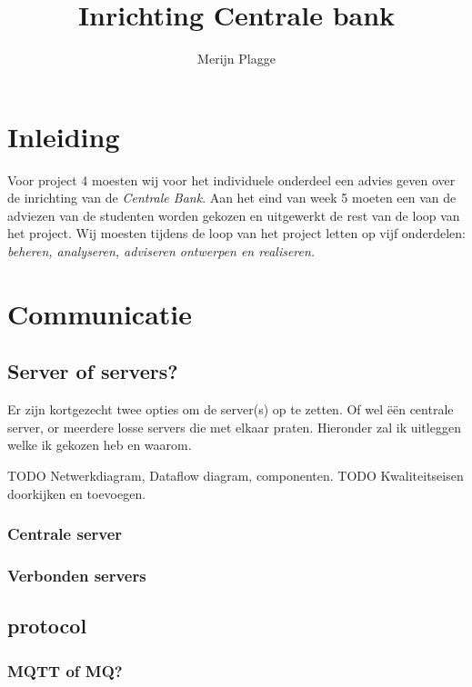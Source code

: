 \documentclass{article}
\begin{document}
\title{Inrichting Centrale bank}
\author{Merijn Plagge}

\maketitle

\section{Inleiding}

Voor project 4 moesten wij voor het individuele onderdeel een advies geven over de inrichting van de \emph{Centrale Bank}.
Aan het eind van week 5 moeten een van de adviezen van de studenten worden gekozen en uitgewerkt de rest van de loop van het project.
Wij moesten tijdens de loop van het project letten op vijf onderdelen: \emph{beheren, analyseren, adviseren ontwerpen en realiseren.}


\newpage

\section{Communicatie}

\subsection{Server of servers?} 

Er zijn kortgezecht twee opties om de server(s) op te zetten.
Of wel \"e\"en centrale server, or meerdere losse servers die met elkaar praten.
Hieronder zal ik uitleggen welke ik gekozen heb en waarom.

TODO Netwerkdiagram, Dataflow diagram, componenten.
TODO Kwaliteitseisen doorkijken en toevoegen.

\subsubsection{Centrale server}

\subsubsection{Verbonden servers}

\subsection{protocol}

\subsubsection{MQTT of MQ?}
\end{document}
